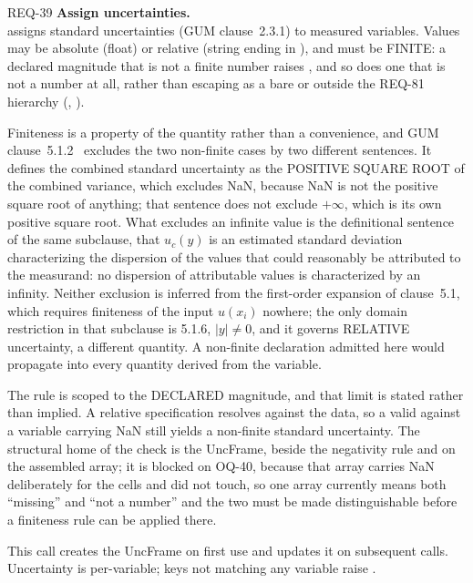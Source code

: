 \begin{reqbox}{REQ-39}{\stable}
\textbf{Assign uncertainties.}\\
 assigns standard
uncertainties (GUM clause~2.3.1) to measured variables. Values may be
absolute (float) or relative (string ending in ), and must be
FINITE: a declared magnitude that is not a finite number raises
, and so does one that is not a number at all,
rather than escaping as a bare  or 
outside the REQ-81 hierarchy (, ).

Finiteness is a property of the quantity rather than a convenience, and
GUM clause~5.1.2~\citep{gum2008} excludes the two non-finite cases by two
different sentences. It defines the combined standard uncertainty as the
POSITIVE SQUARE ROOT of the combined variance, which excludes NaN,
because NaN is not the positive square root of anything; that sentence
does not exclude $+\infty$, which is its own positive square root. What
excludes an infinite value is the definitional sentence of the same
subclause, that $u_c(y)$ is an estimated standard deviation
characterizing the dispersion of the values that could reasonably be
attributed to the measurand: no dispersion of attributable values is
characterized by an infinity. Neither exclusion is inferred from the
first-order expansion of clause~5.1, which requires finiteness of the
input $u(x_i)$ nowhere; the only domain restriction in that subclause is
5.1.6, $|y| \neq 0$, and it governs RELATIVE uncertainty, a different
quantity. A non-finite declaration admitted here would propagate into
every quantity derived from the variable.

The rule is scoped to the DECLARED magnitude, and that limit is stated
rather than implied. A relative specification resolves against the data,
so a valid  against a variable carrying NaN still yields a
non-finite standard uncertainty. The structural home of the check is the
UncFrame, beside the negativity rule and on the assembled array; it is
blocked on OQ-40, because that array carries NaN deliberately for the
cells  and  did not touch, so one
array currently means both ``missing'' and ``not a number'' and the two
must be made distinguishable before a finiteness rule can be applied
there.

This call creates the UncFrame on first use and updates it on subsequent
calls. Uncertainty is per-variable; keys not matching any variable raise
.
\end{reqbox}

